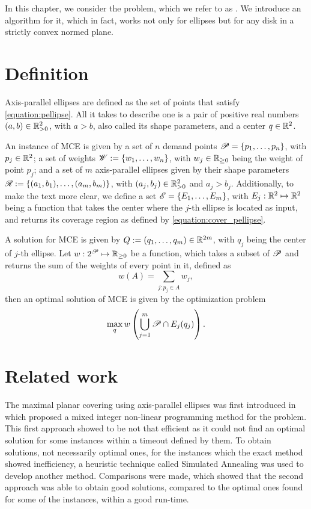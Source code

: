 In this chapter, we consider the problem, which we refer to as . We introduce an algorithm for it, which in fact, works not only for ellipses but for any disk in a strictly convex normed plane.
\section{Definition}

Axis-parallel ellipses are defined as the set of points that satisfy \autoref{equation:pellipse}. All it takes to describe one is a pair of positive real numbers $(a,b) \in \mathbb{R}_{>0}^2$, with $a>b$, also called its shape parameters, and a center $q \in \mathbb{R}^2$.

An instance of MCE is given by a set of $n$ demand points $\mathscr{P} = \{p_1, \dots, p_n\}$, with $p_j\in\mathbb{R}^2$; 
a set of weights $\mathscr{W}:=\{w_1, \dots, w_n\}$, with $w_j\in\mathbb{R}_{\ge0}$ being the weight of point $p_j$;
and a set of $m$ axis-parallel ellipses given by their shape parameters $\mathscr{R}:=\{(a_1, b_1), \dots, (a_m, b_m)\}$, with $(a_j, b_j)\in\mathbb{R}_{>0}^2$ and $a_j>b_j$.
Additionally, to make the text more clear, we define a set $\mathscr{E} = \{E_1, \dots, E_m\}$, with $E_j : \mathbb{R}^2 \mapsto \mathbb{R}^2$ being a function that takes the center where the $j$-th ellipse is located as input, and returns its coverage region as defined by \autoref{equation:cover_pellipse}.

A solution for MCE is given by $Q:=(q_1, \dots, q_m)\in\mathbb{R}^{2m}$, with $q_j$ being the center of $j$-th ellipse.  Let $w: 2^{\mathscr{P}} \mapsto \mathbb{R}_{\ge0}$ be a function, which takes a subset of $\mathscr{P}$ and returns the sum of the weights of every point in it, defined as
\begin{equation*}
w(A) = \sum_{j : p_j \in A} w_j,
\end{equation*}
then an optimal solution of MCE is given by the optimization problem
\begin{equation*}
	\max_q w\left(\bigcup_{j=1}^m \mathscr{P} \cap E_j(q_j)\right).
\end{equation*}

\section{Related work}
The maximal planar covering using axis-parallel ellipses was first introduced in  which proposed a mixed integer non-linear programming method for the problem. This first approach showed to be not that efficient as it could not find an optimal solution for some instances within a timeout defined by them. To obtain solutions, not necessarily optimal ones, for the instances which the exact method showed inefficiency, a heuristic technique called Simulated Annealing was used to develop another method. Comparisons were made, which showed that the second approach was able to obtain good solutions, compared to the optimal ones found for some of the instances, within a good run-time.


